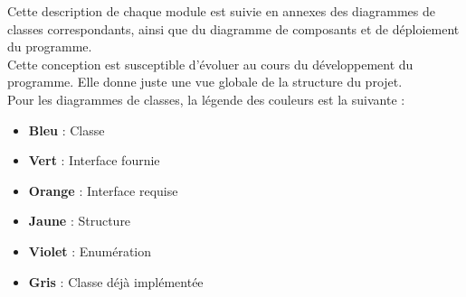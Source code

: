 Cette description de chaque module est suivie en annexes des diagrammes de classes correspondants, ainsi que du diagramme de composants et de déploiement du programme.\\

Cette conception est susceptible d'évoluer au cours du développement du programme. Elle donne juste une vue globale de la structure du projet.\\

Pour les diagrammes de classes, la légende des couleurs est la suivante :

\begin{itemize}
    \item \textbf{Bleu} : Classe
    \item \textbf{Vert} : Interface fournie
    \item \textbf{Orange} : Interface requise
    \item \textbf{Jaune} : Structure
    \item \textbf{Violet} : Enumération
    \item \textbf{Gris} : Classe déjà implémentée
\end{itemize}
